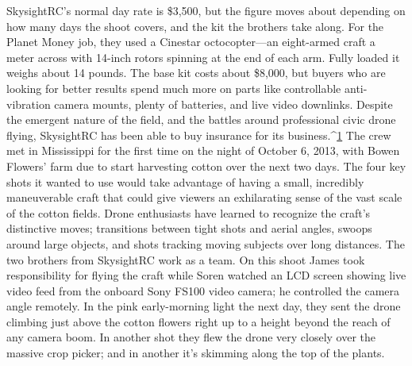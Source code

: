 SkysightRC's normal day rate is \$3,500, but the figure moves about depending
on how many days the shoot covers, and the kit the brothers take along.
For the Planet Money job, they used a Cinestar octocopter—an eight-armed
craft a meter across with 14-inch rotors spinning at the end of each arm.
Fully loaded it weighs about 14 pounds. The base kit costs about \$8,000, but
buyers who are looking for better results spend much more on parts like
controllable anti-vibration camera mounts, plenty of batteries, and live
video downlinks. Despite the emergent nature of the field, and the battles
around professional civic drone flying, SkysightRC has been able to buy
insurance for its business.^{\href{#endnotes-planet-money}{1}}
The crew met in Mississippi for the first time on the night of October 6,
2013, with Bowen Flowers' farm due to start harvesting cotton over the next
two days. The four key shots it wanted to use would take advantage of having
a small, incredibly maneuverable craft that could give viewers an exhilarating
sense of the vast scale of the cotton fields. Drone enthusiasts have
learned to recognize the craft's distinctive moves; transitions between tight
shots and aerial angles, swoops around large objects, and shots tracking
moving subjects over long distances.
The two brothers from SkysightRC work as a team. On this shoot James
took responsibility for flying the craft while Soren watched an LCD screen
showing live video feed from the onboard Sony FS100 video camera; he
controlled the camera angle remotely.
In the pink early-morning light the next day, they sent the drone climbing
just above the cotton flowers right up to a height beyond the reach of
any camera boom. In another shot they flew the drone very closely over
the massive crop picker; and in another it's skimming along the top of
the plants.

